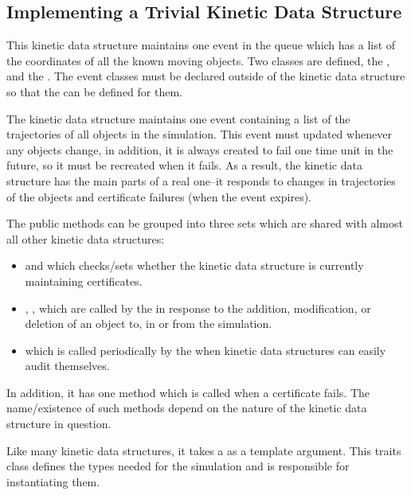
\subsection{Implementing a Trivial Kinetic Data Structure}
\label{sec:trivial_kds_example}

 This kinetic data structure maintains one event in the queue which
has a list of the coordinates of all the known moving objects.  Two
classes are defined, the , and the
. The event classes must be declared outside of the
kinetic data structure so that the  can be defined for
them. 

The kinetic data structure maintains one event containing a list of
the trajectories of all objects in the simulation. This
event must updated whenever any objects change, in addition, it is
always created to fail one time unit in the future, so it must be
recreated when it fails. As a result, the kinetic data structure has
the main parts of a real one--it responds to changes in trajectories
of the objects and certificate failures (when the event expires).

 The public methods can be grouped into three sets which are shared
 with almost all other kinetic data structures:
\begin{itemize}
\item {} and  which
  checks/sets whether the kinetic data structure is currently
  maintaining certificates.
\item {}, ,  which are called by the
   in response to the
  addition, modification, or deletion of an object to, in or from the
  simulation.
\item {} which is called periodically by the
   when kinetic data structures can
  easily audit themselves.
\end{itemize} 

In addition, it has one method which is called when a certificate
fails. The name/existence of such methods depend on the nature of the
kinetic data structure in question.

Like many kinetic data structures, it takes a 
as a template argument. This traits class defines the types needed for
the simulation and is responsible for instantiating them.

 \label{fig:trivial_usage_program}
